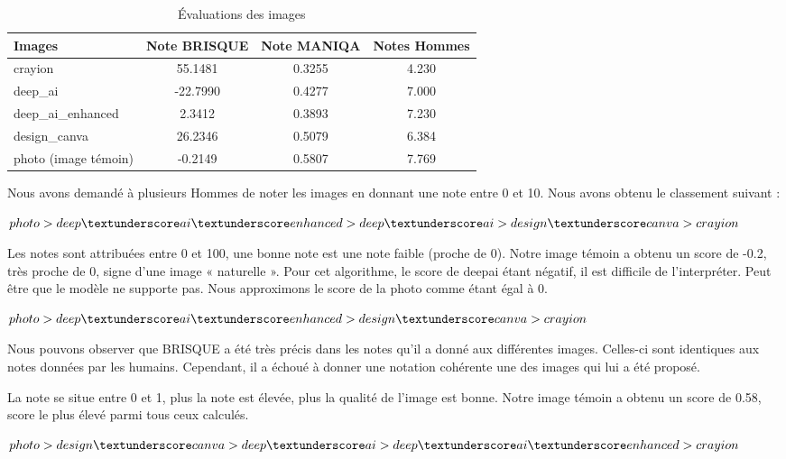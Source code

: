 \documentclass{ieeeaccess}
\begin{document}
\begin{table}[h]
\caption{Évaluations des images}
\label{table_images}
\setlength{\tabcolsep}{1.8pt}
\begin{tabular}{|l|c|c|c|}
    \hline
    \textbf{Images} & \textbf{Note BRISQUE} & \textbf{Note MANIQA} & \textbf{Notes Hommes} \\
    \hline
    crayion & 55.1481 & 0.3255 & 4.230 \\
    deep\_ai & -22.7990 & 0.4277 & 7.000 \\
    deep\_ai\_enhanced & 2.3412 & 0.3893 & 7.230 \\
    design\_canva & 26.2346 & 0.5079 & 6.384 \\
    photo (image témoin) & -0.2149 & 0.5807 & 7.769 \\
    \hline
\end{tabular}
\end{table}

 Nous avons demandé à plusieurs Hommes de noter les images en donnant une note entre 0 et 10. Nous avons obtenu le classement suivant :

$photo > deep\textunderscore ai\textunderscore enhanced > deep\textunderscore ai > design\textunderscore canva > crayion$

 Les notes sont attribuées entre 0 et 100, une bonne note est une note faible (proche de 0). Notre image témoin a obtenu un score de -0.2, très proche de 0, signe d’une image « naturelle ». Pour cet algorithme, le score de deepai étant négatif, il est difficile de l’interpréter. Peut être que le modèle ne supporte pas. Nous approximons le score de la photo comme étant égal à 0.

$photo > deep\textunderscore ai\textunderscore enhanced > design\textunderscore canva > crayion$ 

Nous pouvons observer que BRISQUE a été très précis dans les notes qu’il a donné aux différentes images. Celles-ci sont identiques aux notes données par les humains. Cependant, il a échoué à donner une notation cohérente une des images qui lui a été proposé.

 La note se situe entre 0 et 1, plus la note est élevée, plus la qualité de l’image est bonne. Notre image témoin a obtenu un score de 0.58, score le plus élevé parmi tous ceux calculés. 

$photo > design\textunderscore canva > deep\textunderscore ai > deep\textunderscore ai\textunderscore enhanced > crayion$ 
\end{document}
